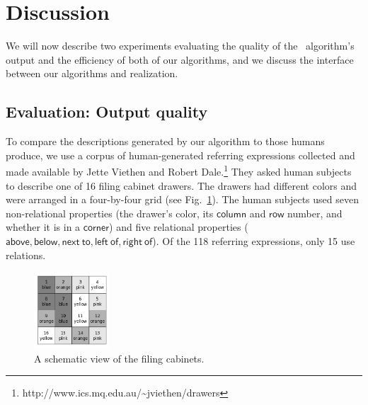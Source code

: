 \section{Discussion} \label{sec:discussion}

We will now describe two experiments evaluating the quality of the \el\
algorithm's output and the efficiency of both of our algorithms, and
we discuss the interface between our algorithms and realization.





\subsection{Evaluation: Output quality}

To compare the descriptions generated by our algorithm to those humans
produce, we use a corpus of human-generated referring expressions
collected and made available by Jette Viethen and Robert
Dale.\footnote{http://www.ics.mq.edu.au/\~{}jviethen/drawers}  They
asked human subjects to describe one of 16 filing cabinet drawers. The
drawers had different colors and were arranged in a four-by-four grid
(see Fig.~\ref{fig:drawers}). The human subjects used seven
non-relational properties (the drawer's color, its $\mathsf{column}$
and $\mathsf{row}$ number, and whether it is in a $\mathsf{corner}$)
and five relational properties ($\mathsf{above, below, next\ to, left\
  of, right\ of}$). Of the 118 referring expressions, only 15 use
relations.

\begin{figure}
\begin{center}
\includegraphics[width=0.25\textwidth]{drawers.png}
\end{center}\vspace*{-3ex}
\caption{A schematic view of the filing cabinets.}\label{fig:drawers}\vspace*{-3ex}
\end{figure}



